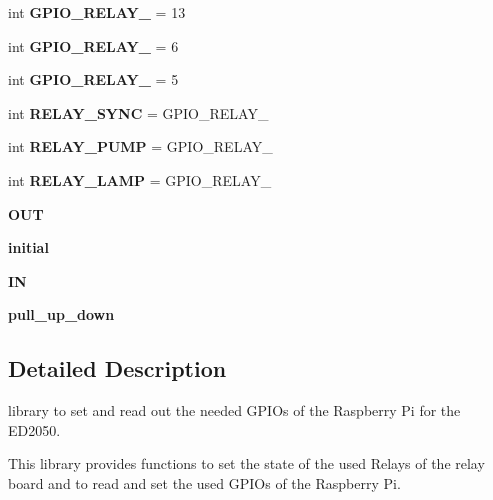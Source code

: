 \begin{DoxyCompactItemize}
\item 
\mbox{\label{namespacegpio_aab43d1dea549649904d3769f1e4c0d61}} 
int {\bfseries G\+P\+I\+O\+\_\+\+R\+E\+L\+A\+Y\+\_} = 13
\item 
\mbox{\label{namespacegpio_a4411eb83b08c08f4bada9829c7545652}} 
int {\bfseries G\+P\+I\+O\+\_\+\+R\+E\+L\+A\+Y\+\_} = 6
\item 
\mbox{\label{namespacegpio_a9d77e1adf0576d511a7a254bc0e34324}} 
int {\bfseries G\+P\+I\+O\+\_\+\+R\+E\+L\+A\+Y\+\_} = 5
\item 
\mbox{\label{namespacegpio_a7fcfbad8e990b6ef97678464c4e9d61f}} 
int {\bfseries R\+E\+L\+A\+Y\+\_\+\+S\+Y\+NC} = G\+P\+I\+O\+\_\+\+R\+E\+L\+A\+Y\+\_
\item 
\mbox{\label{namespacegpio_a96798bf3b1b8808efb45b5c119a9b455}} 
int {\bfseries R\+E\+L\+A\+Y\+\_\+\+P\+U\+MP} = G\+P\+I\+O\+\_\+\+R\+E\+L\+A\+Y\+\_
\item 
\mbox{\label{namespacegpio_a1a9d4f79a30c565fd53ab6ec18e14e2d}} 
int {\bfseries R\+E\+L\+A\+Y\+\_\+\+L\+A\+MP} = G\+P\+I\+O\+\_\+\+R\+E\+L\+A\+Y\+\_
\item 
\mbox{\label{namespacegpio_ae792dab03b33cca067d8ea540c84b21c}} 
{\bfseries O\+UT}
\item 
\mbox{\label{namespacegpio_a8c43f450da26d7e54e495632b84c65ee}} 
{\bfseries initial}
\item 
\mbox{\label{namespacegpio_afbd95a52ee541072ea5aab4346039766}} 
{\bfseries IN}
\item 
\mbox{\label{namespacegpio_ae87237015a81a3f35a98ee614439ae2a}} 
{\bfseries pull\+\_\+up\+\_\+down}
\end{DoxyCompactItemize}


\subsection{Detailed Description}
\begin{DoxyVerb}library to set and read out the needed GPIOs of the Raspberry Pi for the ED2050.

This library provides functions to set the state of the used Relays of
the relay board and to read and set the used GPIOs of the Raspberry Pi.\end{DoxyVerb}
 

